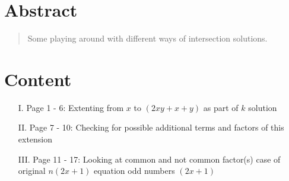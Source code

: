 \newpage
\section*{Abstract}
\label{s:abstract}
\begin{abstract}
	Some playing around with different ways of intersection solutions.
\end{abstract}
\section*{Content}
\label{s:content}
\begin{enumerate}
	\item [I.] Page 1 - 6: Extenting from $x$ to $\left(2xy + x + y\right)$ as part of $k$ solution 
	\item [II.] Page 7 - 10: Checking for possible additional terms and factors of this extension
	\item [III.] Page 11 - 17: Looking at common and not common factor(s) case of original $n\left(2x + 1\right)$ equation odd numbers $\left(2x + 1\right)$
\end{enumerate}

